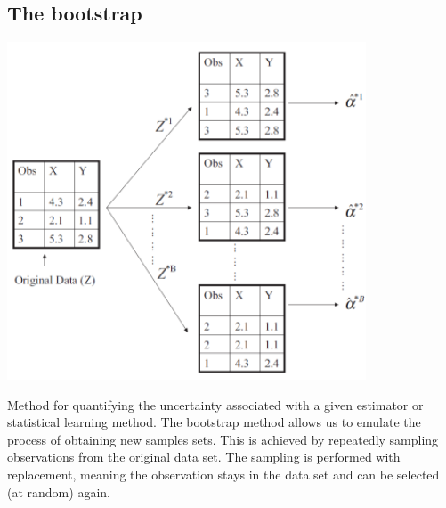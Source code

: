 \documentclass[../document.tex]{subfiles}
\begin{document}
	\subsection{The bootstrap}
	\begin{center}
		\includegraphics[width=0.8\textwidth]{pictures/bootstrap.png}
	\end{center}
	Method for quantifying the uncertainty associated with a given estimator or statistical learning method. The bootstrap method allows us to emulate the process of obtaining new samples sets. This is achieved by repeatedly sampling observations from the original data set.
	The sampling is performed with replacement, meaning the observation stays in the data set and can be selected (at random) again.
\end{document}
